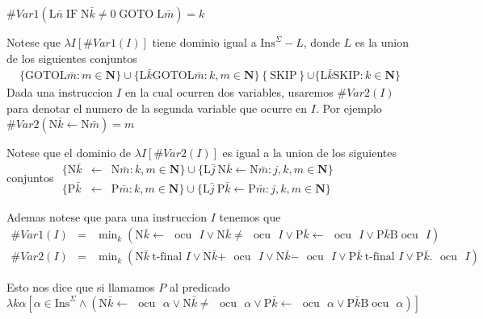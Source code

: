 \(\displaystyle \#Var1\left( \mathrm{L}\bar{n}\;\mathrm{IF\;N}\bar{k}\neq 0\;\mathrm{GOTO\;L} \bar{m}\right) =k \)

Notese que \(\lambda I[\#Var1(I)]\) tiene dominio igual a \(\mathrm{Ins} ^{\Sigma }-L\), donde \(L\) es la union de los siguientes conjuntos \begin{gather*} \{\mathrm{GOTO L}\bar{m}:m\in \mathbf{N\}\cup }\{\mathrm{L}\bar{k} \mathrm{ GOTO L}\bar{m}:k,m\in \mathbf{N\}}
\left\{ \mathrm{SKIP}\right\} \mathbf{\cup }\{\mathrm{L}\bar{k} \mathrm{SKIP }:k\in \mathbf{N\}} \end{gather*} Dada una instruccion \(I\) en la cual ocurren dos variables, usaremos \( \#Var2(I)\) para denotar el numero de la segunda variable que ocurre en \(I\). Por ejemplo
\(\displaystyle \#Var2\left( \mathrm{N}\bar{k}\leftarrow \mathrm{N}\bar{m}\right) =m \)

Notese que el dominio de \(\lambda I[\#Var2(I)]\) es igual a la union de los siguientes conjuntos
\(\displaystyle \begin{array}{rcl} \{\mathrm{N}\bar{k} & \leftarrow & \mathrm{N}\bar{m}:k,m\in \mathbf{N\}\cup }\{ \mathrm{L}\bar{j}\ \mathrm{N}\bar{k}\leftarrow \mathrm{N}\bar{m}:j,k,m\in \mathbf{N\}} \\ \{\mathrm{P}\bar{k} & \leftarrow & \mathrm{P}\bar{m}:k,m\in \mathbf{N\}\cup }\{ \mathrm{L}\bar{j}\ \mathrm{P}\bar{k}\leftarrow \mathrm{P}\bar{m}:j,k,m\in \mathbf{N\}} \end{array} \)

Ademas notese que para una instruccion \(I\) tenemos que
\(\displaystyle \begin{array}{rcl} \#Var1(I) & =& \min_{k}(\mathrm{N}\bar{k}\mathrm{\leftarrow }\text{ }\mathrm{ ocu}\text{ }I\vee \mathrm{N}\bar{k}\mathrm{\neq }\text{ }\mathrm{ocu}\text{ } I\vee \mathrm{P}\bar{k}\mathrm{\leftarrow }\text{ }\mathrm{ocu}\text{ }I\vee \mathrm{P}\bar{k}\mathrm{B}\;\mathrm{ocu}\text{ }I) \\ \#Var2(I) & =& \min_{k}(\mathrm{N}\bar{k}\ \text{t-final }I\vee \mathrm{N}\bar{ k}\mathrm{+}\text{ }\mathrm{ocu}\text{ }I\vee \mathrm{N}\bar{k}\mathrm{\dot{- }}\text{ }\mathrm{ocu}\text{ }I\vee \mathrm{P}\bar{k}\ \text{t-final }I\vee \mathrm{P}\bar{k}.\text{ }\mathrm{ocu}\text{ }I) \end{array} \)

Esto nos dice que si llamamos \(P\) al predicado
\(\displaystyle \lambda k\alpha \left[ \alpha \in \mathrm{Ins}^{\Sigma }\wedge (\mathrm{N} \bar{k}\mathrm{\leftarrow }\text{ }\mathrm{ocu}\text{ }\alpha \vee \mathrm{N} \bar{k}\mathrm{\neq }\text{ }\mathrm{ocu}\text{ }\alpha \vee \mathrm{P}\bar{k }\mathrm{\leftarrow }\text{ }\mathrm{ocu}\text{ }\alpha \vee \mathrm{P}\bar{k }\mathrm{B}\;\mathrm{ocu}\text{ }\alpha )\right] \)

